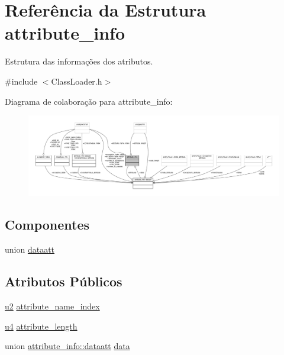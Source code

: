 \hypertarget{structattribute__info}{}\section{Referência da Estrutura attribute\+\_\+info}
\label{structattribute__info}


Estrutura das informações dos atributos.  




{\ttfamily \#include $<$Class\+Loader.\+h$>$}



Diagrama de colaboração para attribute\+\_\+info\+:
\nopagebreak
\begin{figure}[H]
\begin{center}
\leavevmode
\includegraphics[width=350pt]{structattribute__info__coll__graph}
\end{center}
\end{figure}
\subsection*{Componentes}
\begin{DoxyCompactItemize}
\item 
union \hyperlink{unionattribute__info_1_1dataatt}{dataatt}
\end{DoxyCompactItemize}
\subsection*{Atributos Públicos}
\begin{DoxyCompactItemize}
\item 
\hyperlink{ClassLoader_8h_a5f223212eef04d10a4550ded680cb1cf}{u2} \hyperlink{structattribute__info_a19df9d4b42eb55ca5dc1bed98df89378}{attribute\+\_\+name\+\_\+index}
\item 
\hyperlink{ClassLoader_8h_aedf6ddc03df8caaaccbb4c60b9a9b850}{u4} \hyperlink{structattribute__info_a1ed8f679458c4bb0ed3315721588f50d}{attribute\+\_\+length}
\item 
union \hyperlink{unionattribute__info_1_1dataatt}{attribute\+\_\+info\+::dataatt} \hyperlink{structattribute__info_a63cd7230a276bdc8fc0d9eefc730c0db}{data}
\end{DoxyCompactItemize}



